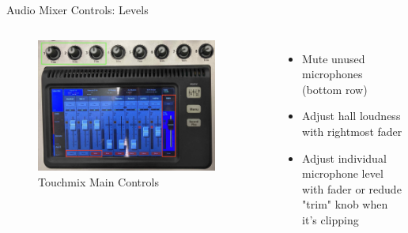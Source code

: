 
\begin{frame}{Audio Mixer Controls: Levels}
	\begin{columns}[T,onlytextwidth]
		\begin{figure} 
			\centering
			\includegraphics[width=0.9\textwidth]{images/touchmix-main-controls.jpg}
			\caption{Touchmix Main Controls}
		\end{figure}
		\begin{itemize}
			\item Mute unused microphones (bottom row)
			\item Adjust hall loudness with rightmost fader
			\item Adjust individual microphone level with fader or redude "trim" knob when it's clipping
		\end{itemize}
	\end{columns}
\end{frame}

